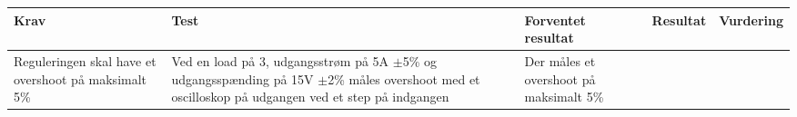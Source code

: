 \begin{tabularx}{\textwidth}{|X|X|X|X|X|}
	\hline
	\textbf{Krav} & \textbf{Test} & \textbf{Forventet resultat} & \textbf{Resultat} & \textbf{Vurdering} \\ \hline
	Reguleringen skal have et overshoot på maksimalt 5\% & Ved en load på 3\ohm, udgangsstrøm på 5A $\pm$5\% og udgangsspænding på 15V $\pm$2\% måles overshoot med et oscilloskop på udgangen ved et step på indgangen & Der måles et overshoot på maksimalt 5\% && \\ \hline
\end{tabularx}